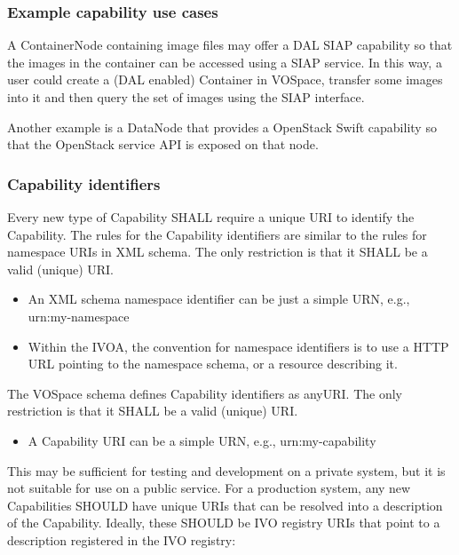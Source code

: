 \documentclass[11pt,a4paper]{ivoa}
\begin{document}
\subsubsection{Example capability use cases}
\label{subsubsec:example capability use cases}
A ContainerNode containing image files may offer a DAL SIAP capability so that the images in the container can be accessed using a SIAP service. In this way, a user could create a (DAL enabled) Container in VOSpace, transfer some images into it and then query the set of images using the SIAP interface.

Another example is a DataNode that provides a OpenStack Swift capability so that the OpenStack service API is exposed on that node.

\subsubsection{Capability identifiers}
\label{subsubsec:capability identifiers}
Every new type of Capability SHALL require a unique URI to identify the Capability. The rules for the Capability identifiers are similar to the rules for namespace URIs in XML schema. The only restriction is that it SHALL be a valid (unique) URI.

\begin{itemize}
    \item An XML schema namespace identifier can be just a simple URN, e.g., urn:my-namespace
    \item Within the IVOA, the convention for namespace identifiers is to use a HTTP URL pointing to the namespace schema, or a resource describing it.
\end{itemize}

The VOSpace schema defines Capability identifiers as anyURI. The only restriction is that it SHALL be a valid (unique) URI.

\begin{itemize}
    \item A Capability URI can be a simple URN, e.g., urn:my-capability
\end{itemize}

This may be sufficient for testing and development on a private system, but it is not suitable for use on a public service. For a production system, any new Capabilities SHOULD have unique URIs that can be resolved into a description of the Capability. Ideally, these SHOULD be IVO registry URIs that point to a description registered in the IVO registry:
\end{document}
